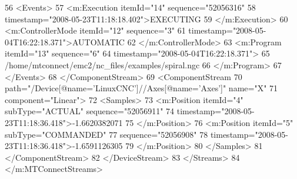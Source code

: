 56         <Events>
57           <m:Execution itemId="14" sequence="52056316"
58                        timestamp="2008-05-23T11:18:18.402">EXECUTING
59           </m:Execution>
60           <m:ControllerMode itemId="12" sequence="3"
61                             timestamp="2008-05-04T16:22:18.371">AUTOMATIC
62           </m:ControllerMode>
63           <m:Program itemId="13" sequence="6"
64                      timestamp="2008-05-04T16:22:18.371">
65             /home/mtconnect/emc2/nc_files/examples/spiral.ngc
66           </m:Program>
67         </Events>
68       </ComponentStream>
69       <ComponentStream
70          path="/Device[@name='LinuxCNC']//Axes[@name='Axes']" name="X"
71          component="Linear"> 
72         <Samples>
73           <m:Position itemId="4" subType="ACTUAL" sequence="52056911"
74                       timestamp="2008-05-23T11:18:36.418">-1.6620382071
75           </m:Position>
76           <m:Position itemId="5" subType="COMMANDED"
77                       sequence="52056908"
78                       timestamp="2008-05-23T11:18:36.418">-1.6591126305
79           </m:Position>
80         </Samples>
81       </ComponentStream>
82     </DeviceStream>
83   </Streams>
84 </m:MTConnectStreams>
